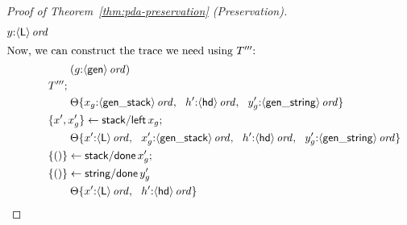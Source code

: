 \begin{proof}[Proof of Theorem~\ref{thm:pda-preservation} (Preservation)]
\begin{align*}
{                   y{:}{\langle {\sf L} \rangle}\,{{\it ord}}}\\
\intertext{Now, we can construct the trace we need using $T'''$:}
& \qquad 
({g{:}{\langle {\sf gen} \rangle}\,{{\it ord}}})\\
& T''';\\
& \qquad {\Theta}\{{
                   x_g{:}{\langle {\sf gen\_stack} \rangle}\,{{\it ord}}, ~~
                   h'{:}{\langle {\sf hd} \rangle}\,{{\it ord}}, ~~
                   y_g'{:}{\langle {\sf gen\_string} \rangle}\,{{\it ord}}}\}\\
& \{{x', x_g'}\} \leftarrow {{\sf stack/left}\,x_g};\\
& \qquad {\Theta}\{{
                   x'{:}{\langle {\sf L} \rangle}\,{{\it ord}}, ~~
                   x_g'{:}{\langle {\sf gen\_stack} \rangle}\,{{\it ord}}, ~~
                   h'{:}{\langle {\sf hd} \rangle}\,{{\it ord}}, ~~
                   y_g'{:}{\langle {\sf gen\_string} \rangle}\,{{\it ord}}}\}\\
& \{{()}\} \leftarrow {{\sf stack/done}\,x_g'};\\
& \{{()}\} \leftarrow {{\sf string/done}\,y_g'}\\
& \qquad {\Theta}\{{
                   x'{:}{\langle {\sf L} \rangle}\,{{\it ord}}, ~~
                   h'{:}{\langle {\sf hd} \rangle}\,{{\it ord}}}\}
\end{align*}


\end{proof}
